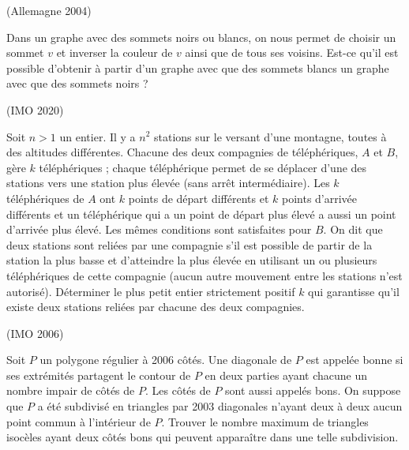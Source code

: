 \begin{exo}
(Allemagne 2004)

Dans un graphe avec des sommets noirs ou blancs, on nous permet de choisir un sommet $v$ et inverser la couleur de $v$ ainsi que de tous ses voisins. Est-ce qu’il est possible d’obtenir à partir d’un graphe avec que des sommets blancs un graphe avec que des sommets noirs ?\\

\end{exo}


\begin{exo}

(IMO 2020)

Soit $n > 1$ un entier. Il y a $n^2$ stations sur le versant d’une montagne, toutes à des altitudes différentes. Chacune des deux compagnies de téléphériques, $A$ et $B$, gère $k$ téléphériques ; chaque téléphérique permet de se déplacer d’une des stations vers une station plus élevée (sans arrêt intermédiaire). Les $k$ téléphériques de $A$ ont $k$ points de départ différents et $k$ points d’arrivée différents et un téléphérique qui a un point de départ plus élevé a aussi un point d’arrivée plus élevé. Les mêmes conditions sont satisfaites pour $B$. On dit que deux stations sont reliées par une compagnie s’il est possible de partir de la station la plus basse et d’atteindre la plus élevée en utilisant un ou plusieurs téléphériques de cette compagnie (aucun autre mouvement entre les stations n’est autorisé). Déterminer le plus petit entier strictement positif $ k$ qui garantisse qu’il existe deux stations reliées par chacune des deux compagnies.

\end{exo}



\begin{exo}
(IMO 2006)

 Soit $P$ un polygone régulier à 2006 côtés. Une diagonale de $P$ est appelée bonne si ses extrémités partagent le contour de $P$ en deux parties ayant chacune un nombre impair de côtés de $P$. Les côtés de $P$ sont aussi appelés bons. On suppose que $P$ a été subdivisé en triangles par 2003 diagonales n’ayant deux à deux aucun point commun à l’intérieur de $P$. Trouver le nombre maximum de triangles isocèles ayant deux côtés bons qui peuvent apparaître dans une telle subdivision.

\end{exo}



